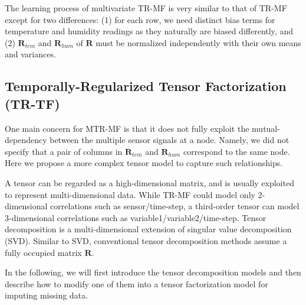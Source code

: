 The learning process of multivariate TR-MF is very similar to that of TR-MF except for two differences:
(1) for each row, we need distinct bias terms for temperature and humidity readings as they naturally are biased differently, and (2) $\mathbf{R}_{tem}$ and $\mathbf{R}_{hum}$ of $\mathbf{R}$ must be normalized independently with their own means and variances. 

 
\subsection{Temporally-Regularized Tensor Factorization (TR-TF)} \label{sec:tensordecomp}

One main concern for MTR-MF is that it does not fully exploit the mutual-dependency between the 
multiple sensor signals at a node. Namely, we did not specify that a pair of columns in 
$\mathbf{R}_{tem}$ and $\mathbf{R}_{hum}$ correspond to the same node. Here we propose a more 
complex tensor model to capture such relationships.

A tensor can be regarded as a high-dimensional matrix, and is usually exploited to represent 
multi-dimensional data.  While TR-MF could model only 2-dimensional correlations such as
sensor/time-step, a third-order tensor can model 3-dimensional correlations
such as variable1/variable2/time-step.
%
Tensor decomposition is a multi-dimensional extension of singular value decomposition (SVD). Similar to SVD, conventional tensor decomposition methods assume a fully occupied matrix $\mathbf{R}$.

In the following, we will first introduce the tensor decomposition models and then describe how to modify one of them into a tensor factorization model for imputing missing data.

 
